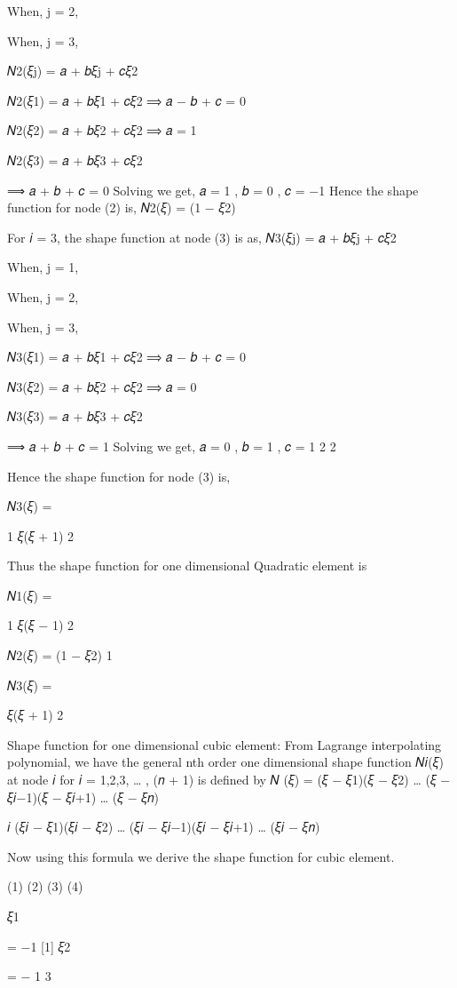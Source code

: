 {{{{When, j = 2,



When, j = 3,
 
𝑁2(𝜉j) = 𝑎 + 𝑏𝜉j + 𝑐𝜉2


𝑁2(𝜉1) = 𝑎 + 𝑏𝜉1 + 𝑐𝜉2
⟹ 𝑎 − 𝑏 + 𝑐 = 0

𝑁2(𝜉2) = 𝑎 + 𝑏𝜉2 + 𝑐𝜉2
⟹ 𝑎 = 1

𝑁2(𝜉3) = 𝑎 + 𝑏𝜉3 + 𝑐𝜉2
 
⟹ 𝑎 + 𝑏 + 𝑐 = 0
Solving we get,	𝑎 = 1 , 𝑏 = 0 ,  𝑐 = −1
Hence the shape function for node (2) is,
𝑁2(𝜉) = (1 − 𝜉2)
 
For 𝑖 = 3, the shape function at node (3) is as,
𝑁3(𝜉j) = 𝑎 + 𝑏𝜉j + 𝑐𝜉2

 
When, j = 1,



When, j = 2,



When, j = 3,
 

𝑁3(𝜉1) = 𝑎 + 𝑏𝜉1 + 𝑐𝜉2
⟹ 𝑎 − 𝑏 + 𝑐 = 0

𝑁3(𝜉2) = 𝑎 + 𝑏𝜉2 + 𝑐𝜉2
⟹ 𝑎 = 0

𝑁3(𝜉3) = 𝑎 + 𝑏𝜉3 + 𝑐𝜉2
 
⟹ 𝑎 + 𝑏 + 𝑐 = 1
Solving we get,	𝑎 = 0 ,  𝑏 = 1 ,  𝑐 = 1
2	2

Hence the shape function for node (3) is,

 
𝑁3(𝜉) =
 
1
  𝜉(𝜉 + 1)
2
 
Thus the shape function for one dimensional Quadratic element is

 
𝑁1(𝜉) =
 
1
  𝜉(𝜉 − 1)
2
 
𝑁2(𝜉) = (1 − 𝜉2)
1
 
𝑁3(𝜉) =
 
  𝜉(𝜉 + 1)
2
 


Shape function for one dimensional cubic element:
From Lagrange interpolating polynomial, we have the general nth order one dimensional shape function 𝑁𝑖(𝜉) at node 𝑖 for 𝑖 = 1,2,3, … , (𝑛 + 1) is defined by
𝑁 (𝜉) =	(𝜉 − 𝜉1)(𝜉 − 𝜉2) … (𝜉 − 𝜉𝑖−1)(𝜉 − 𝜉𝑖+1) … (𝜉 − 𝜉𝑛)
 
𝑖	(𝜉𝑖 − 𝜉1)(𝜉𝑖 − 𝜉2) … (𝜉𝑖 − 𝜉𝑖−1)(𝜉𝑖 − 𝜉𝑖+1) … (𝜉𝑖 − 𝜉𝑛)
 
Now using this formula we derive the shape function for cubic element.


(1)	(2)	(3)	(4)
 
 
𝜉1
 
= −1	[1]	𝜉2
 
= − 1
3
 
}}}}
